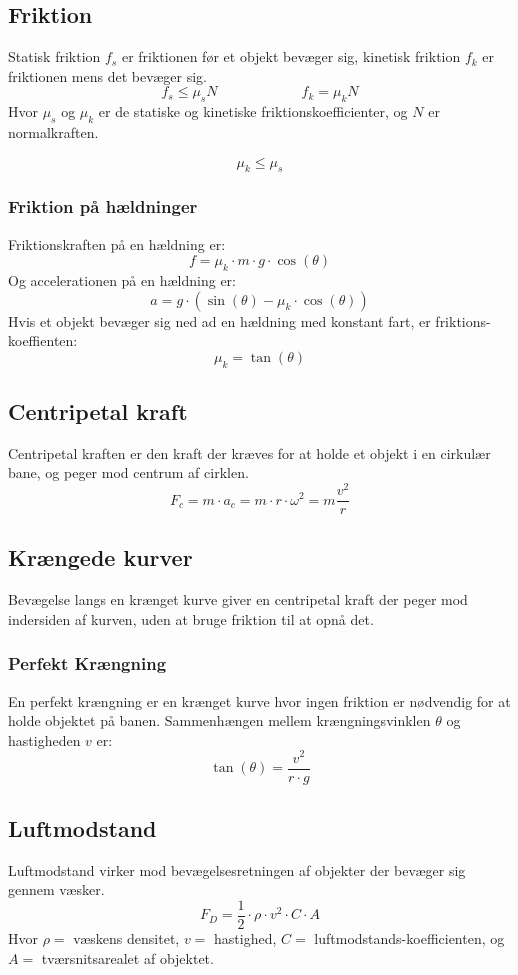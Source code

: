 \subsection{Friktion}
Statisk friktion $f_s$ er friktionen før et objekt bevæger sig, kinetisk friktion $f_k$ er friktionen mens det bevæger sig.
\[
    f_s \le \mu_s N \hspace{6em} f_k = \mu_k N
\]
Hvor $\mu_s$ og $\mu_k$ er de statiske og kinetiske friktionskoefficienter, og $N$ er normalkraften.

\[
    \mu_k \le \mu_s
\]


\subsubsection{Friktion på hældninger}
Friktionskraften på en hældning er:
\[
    f = \mu_k \cdot m \cdot g \cdot \cos(\theta)
\]
Og accelerationen på en hældning er:
\[
    a = g \cdot (\sin(\theta) - \mu_k \cdot \cos(\theta))
\]
Hvis et objekt bevæger sig ned ad en hældning med konstant fart, er friktions-koeffienten:
\[
    \mu_k = \tan(\theta)
\]

\subsection{Centripetal kraft}
Centripetal kraften er den kraft der kræves for at holde et objekt i en cirkulær bane, og peger mod centrum af cirklen.
\[
    F_c = m \cdot a_c = m \cdot r \cdot \omega^2 = m \frac{v^2}{r}
\]

\subsection{Krængede kurver}
Bevægelse langs en krænget kurve giver en centripetal kraft der peger mod indersiden af kurven, uden at bruge friktion til at opnå det.

\subsubsection{Perfekt Krængning}

En perfekt krængning er en krænget kurve hvor ingen friktion er nødvendig for at holde objektet på banen. Sammenhængen mellem krængningsvinklen $\theta$ og hastigheden $v$ er:
\[
    \tan(\theta) = \frac{v^2}{r \cdot g}
\]

\subsection{Luftmodstand}
Luftmodstand virker mod bevægelsesretningen af objekter der bevæger sig gennem væsker.
\[
    F_D = \frac{1}{2} \cdot \rho \cdot v^2 \cdot C \cdot A
\]
Hvor $\rho =$ væskens densitet, $v =$ hastighed, $C =$ luftmodstands-koefficienten, og $A =$ tværsnitsarealet af objektet.

